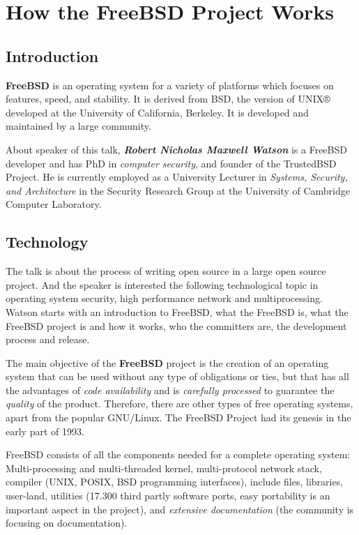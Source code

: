 \documentclass[11pt]{article}
\begin{document}
\section{How the FreeBSD Project Works}

\subsection{Introduction}
\textbf{FreeBSD} is an operating system for a variety of platforms which focuses on features, speed, and stability. It is derived from BSD, the version of UNIX® developed at the University of California, Berkeley. It is developed and maintained by a large community. 

About speaker of this talk, \textbf{\emph{Robert Nicholas Maxwell Watson}} is a FreeBSD developer and has PhD in \emph{computer security}, and founder of the TrustedBSD Project. He is currently employed as a University Lecturer in \emph{Systems, Security, and Architecture }in the Security Research Group at the University of Cambridge Computer Laboratory.

\subsection{Technology}
The talk is about the process of writing open source in a large open source project. And the speaker is interested the following technological topic in operating system security, high performance network and multiprocessing. Watson starts with an introduction to FreeBSD, what the FreeBSD is, what the FreeBSD project is and how it works, who the committers are, the development process and release.

The main objective of the \textbf{FreeBSD} project is the creation of an operating system that can be used without any type of obligations or ties, but that has all the advantages of \emph{code availability} and is \emph{carefully processed }to guarantee the \emph{quality} of the product. Therefore, there are other types of free operating systems, apart from the popular GNU/Linux. The FreeBSD Project had its genesis in the early part of 1993.  

FreeBSD consists of all the components needed for a complete operating system: Multi-processing and multi-threaded kernel, multi-protocol network stack, compiler (UNIX, POSIX, BSD programming interfaces), include files, libraries, user-land, utilities (17.300 third partly software ports, easy portability is an important aspect in the project), and \emph{extensive documentation} (the community is focusing on documentation). 
\end{document}
